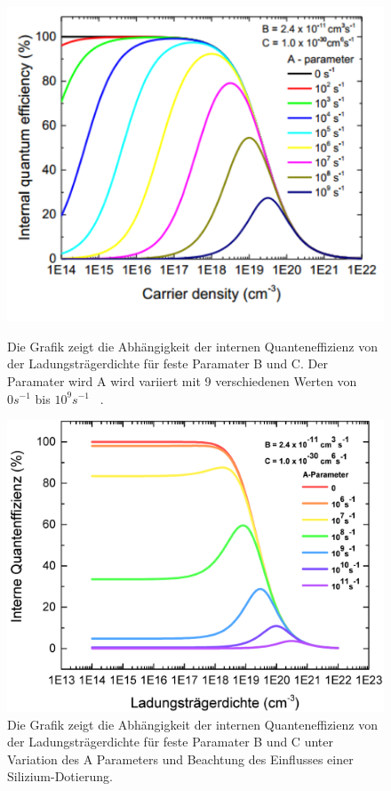 \begin{figure}[tb]
    \centering
    \begin{minipage}[t]{0.49\linewidth}
        \centering
        \includegraphics[width=\linewidth]{Bilder/IQEabhA.png}
        \caption{Die Grafik zeigt die Abhängigkeit der internen Quanteneffizienz von der Ladungsträgerdichte für feste Paramater B und C. Der Paramater wird A wird variiert mit 9 verschiedenen Werten von $0 s^{-1} $ bis $10^9 s^{-1}$ ~\cite{semreich}.}
        \label{fig:abha}
    \end{minipage}%
    \hfill
    \begin{minipage}[t]{0.49\linewidth}
        \centering
        \includegraphics[width=\linewidth]{Bilder/IQEmitDotierungVerschAParams.pdf}
        \caption{Die Grafik zeigt die Abhängigkeit der internen Quanteneffizienz von der Ladungsträgerdichte für feste Paramater B und C unter Variation des A Parameters und Beachtung des Einflusses einer Silizium-Dotierung.}
        \label{fig:abha1}
    \end{minipage}
\end{figure}
